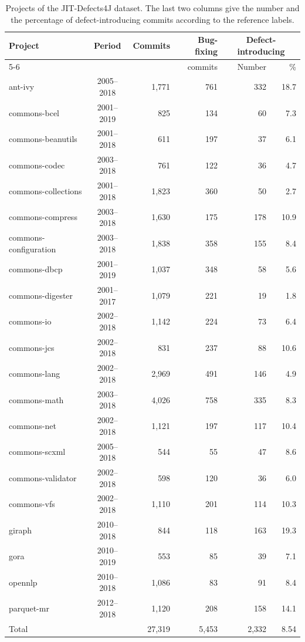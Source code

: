 \documentclass[12pt,a4paper,oneside]{report}
\begin{document}
\begin{table}[htbp]
\centering\small
\caption{Projects of the JIT-Defects4J dataset. The last two columns give the
number and the percentage of defect-introducing commits according to the
reference labels.}
\label{tab:projects}
\begin{tabular}{@{}lcrrrr@{}}
\toprule
Project & Period & Commits & Bug-fixing & \multicolumn{2}{c}{Defect-introducing} \\
\cmidrule(l){5-6}
 & & & commits & Number & \% \\
\midrule
ant-ivy & 2005--2018 & 1,771 & 761 & 332 & 18.7 \\
commons-bcel & 2001--2019 & 825 & 134 & 60 & 7.3 \\
commons-beanutils & 2001--2018 & 611 & 197 & 37 & 6.1 \\
commons-codec & 2003--2018 & 761 & 122 & 36 & 4.7 \\
commons-collections & 2001--2018 & 1,823 & 360 & 50 & 2.7 \\
commons-compress & 2003--2018 & 1,630 & 175 & 178 & 10.9 \\
commons-configuration & 2003--2018 & 1,838 & 358 & 155 & 8.4 \\
commons-dbcp & 2001--2019 & 1,037 & 348 & 58 & 5.6 \\
commons-digester & 2001--2017 & 1,079 & 221 & 19 & 1.8 \\
commons-io & 2002--2018 & 1,142 & 224 & 73 & 6.4 \\
commons-jcs & 2002--2018 & 831 & 237 & 88 & 10.6 \\
commons-lang & 2002--2018 & 2,969 & 491 & 146 & 4.9 \\
commons-math & 2003--2018 & 4,026 & 758 & 335 & 8.3 \\
commons-net & 2002--2018 & 1,121 & 197 & 117 & 10.4 \\
commons-scxml & 2005--2018 & 544 & 55 & 47 & 8.6 \\
commons-validator & 2002--2018 & 598 & 120 & 36 & 6.0 \\
commons-vfs & 2002--2018 & 1,110 & 201 & 114 & 10.3 \\
giraph & 2010--2018 & 844 & 118 & 163 & 19.3 \\
gora & 2010--2019 & 553 & 85 & 39 & 7.1 \\
opennlp & 2010--2018 & 1,086 & 83 & 91 & 8.4 \\
parquet-mr & 2012--2018 & 1,120 & 208 & 158 & 14.1 \\
\midrule
Total & & 27,319 & 5,453 & 2,332 & 8.54 \\
\bottomrule
\end{tabular}
\end{table}
\end{document}
